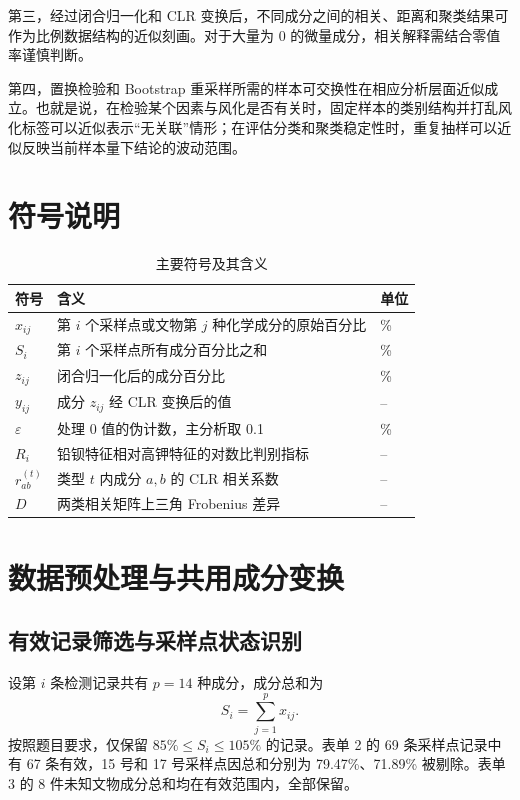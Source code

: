 \documentclass[UTF8,zihao=-4,a4paper,fontset=fandol]{ctexart}
\begin{document}
第三，经过闭合归一化和 CLR 变换后，不同成分之间的相关、距离和聚类结果可作为比例数据结构的近似刻画。对于大量为 0 的微量成分，相关解释需结合零值率谨慎判断。

第四，置换检验和 Bootstrap 重采样所需的样本可交换性在相应分析层面近似成立。也就是说，在检验某个因素与风化是否有关时，固定样本的类别结构并打乱风化标签可以近似表示“无关联”情形；在评估分类和聚类稳定性时，重复抽样可以近似反映当前样本量下结论的波动范围。

\section{符号说明}

\begin{table}[H]
  \centering
  \caption{主要符号及其含义}
  \label{tab:symbols}
  \begin{tabular}{C{0.18\textwidth}L{0.62\textwidth}C{0.12\textwidth}}
    \toprule
    符号 & 含义 & 单位 \\
    \midrule
    $x_{ij}$ & 第 $i$ 个采样点或文物第 $j$ 种化学成分的原始百分比 & \% \\
    $S_i$ & 第 $i$ 个采样点所有成分百分比之和 & \% \\
    $z_{ij}$ & 闭合归一化后的成分百分比 & \% \\
    $y_{ij}$ & 成分 $z_{ij}$ 经 CLR 变换后的值 & -- \\
    $\varepsilon$ & 处理 0 值的伪计数，主分析取 0.1 & \% \\
    $R_i$ & 铅钡特征相对高钾特征的对数比判别指标 & -- \\
    $r_{ab}^{(t)}$ & 类型 $t$ 内成分 $a,b$ 的 CLR 相关系数 & -- \\
    $D$ & 两类相关矩阵上三角 Frobenius 差异 & -- \\
    \bottomrule
  \end{tabular}
\end{table}

\section{数据预处理与共用成分变换}

\subsection{有效记录筛选与采样点状态识别}

设第 $i$ 条检测记录共有 $p=14$ 种成分，成分总和为
\begin{equation}
  S_i=\sum_{j=1}^{p}x_{ij}.
  \label{eq:sum}
\end{equation}
按照题目要求，仅保留 $85\%\le S_i\le105\%$ 的记录。表单 2 的 69 条采样点记录中有 67 条有效，15 号和 17 号采样点因总和分别为 79.47\%、71.89\% 被剔除。表单 3 的 8 件未知文物成分总和均在有效范围内，全部保留。
\end{document}
